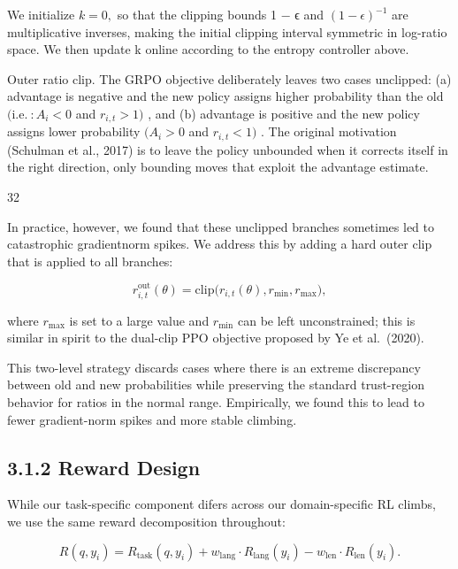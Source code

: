 \documentclass[
  10
]{article}
\begin{document}
We initialize \(k = 0 ,\) so that the clipping bounds 1 − ϵ and
\(( 1 - \epsilon ) ^ { - 1 }\) are multiplicative inverses, making the
initial clipping interval symmetric in log-ratio space. We then update k
online according to the entropy controller above.

Outer ratio clip. The GRPO objective deliberately leaves two cases
unclipped: (a) advantage is negative and the new policy assigns higher
probability than the old
\(( \mathrm { i } . \mathrm { e } . \ : A _ { i } < 0\) and
\(r _ { i , t } > 1 )\) , and (b) advantage is positive and the new
policy assigns lower probability \(( A _ { i } > 0\) and
\(r _ { i , t } < 1 )\) . The original motivation (Schulman et al.,
2017) is to leave the policy unbounded when it corrects itself in the
right direction, only bounding moves that exploit the advantage
estimate.

32

In practice, however, we found that these unclipped branches sometimes
led to catastrophic gradientnorm spikes. We address this by adding a
hard outer clip that is applied to all branches:

\[
r _ { i , t } ^ { \mathrm { o u t } } ( \theta ) = \mathrm { c l i p } \big ( r _ { i , t } ( \theta ) , r _ { \mathrm { m i n } } , r _ { \mathrm { m a x } } \big ) ,\tag{9}
\]

where \(r _ { \mathrm { m a x } }\) is set to a large value and
\(r _ { \mathrm { m i n } }\) can be left unconstrained; this is similar
in spirit to the dual-clip PPO objective proposed by Ye et al.~(2020).

This two-level strategy discards cases where there is an extreme
discrepancy between old and new probabilities while preserving the
standard trust-region behavior for ratios in the normal range.
Empirically, we found this to lead to fewer gradient-norm spikes and
more stable climbing.

\subsection{3.1.2 Reward Design}\label{reward-design}

While our task-specific component difers across our domain-specific RL
climbs, we use the same reward decomposition throughout:

\[
R ( q , y _ { i } ) = R _ { \mathrm { t a s k } } ( q , y _ { i } ) + w _ { \mathrm { l a n g } } \cdot R _ { \mathrm { l a n g } } ( y _ { i } ) - w _ { \mathrm { l e n } } \cdot R _ { \mathrm { l e n } } ( y _ { i } ) .\tag{10}
\]
\end{document}
